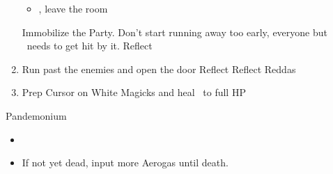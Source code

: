 \begin{enumerate}
\begin{itemize}
\begin{gambit}
\begin{itemize}
			            \end{itemize}
		            \end{gambit}
		      \item \leader{\vaan}, leave the room
	      \end{itemize}
	      \penelof Immobilize the Party. Don't start running away too early, everyone but \vaan\ needs to get hit by it.
	      \ashef Reflect \ashe
	\item Run past the enemies and open the door
	      \penelof Reflect \penelo
	      \ashef Reflect Reddas
	      \gambiton{\ashe}
	\item Prep Cursor on White Magicks and heal \vaan\ to full HP
\end{enumerate}
\begin{battle}{Pandemonium}
	\begin{itemize}
		\penelof Dispell
		\vaanf Run a little bit to the right, so that the others don't get hit by Flatten/Power Spin, and so that Reddas can't reach 
		\vaanf Confuse once Dispel has charged a bit
		\vaanf Confuse 3 times total
		\penelof Aeroga the Party after inputting the third Confuse
		\item \GirlsGambitOff
		\item If not yet dead, input more Aerogas until death.
	\end{itemize}
\end{battle}